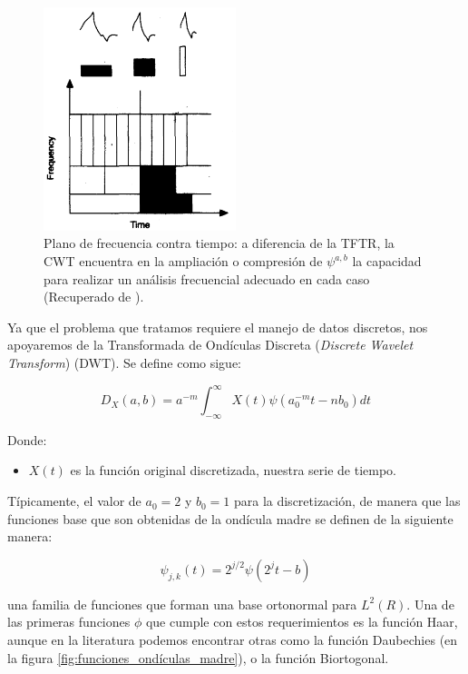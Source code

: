 \begin{figure}[h]
    \centering
    \includegraphics[width=0.5\textwidth]{Figuras/descomposicion/tiempo_frecuencia_WT.png}
    \caption{Plano de frecuencia contra tiempo: a diferencia de la TFTR, la CWT encuentra en la ampliación o compresión de $\psi^{a,b}$ la capacidad para realizar un análisis frecuencial adecuado en cada caso (Recuperado de \cite{an_introduction_to_wavelets}).} 
    \label{fig:tiempo_frecuencia_CWT}
\end{figure}

Ya que el problema que tratamos requiere el manejo de datos discretos, nos apoyaremos de la Transformada de Ondículas Discreta (\textit{Discrete Wavelet Transform}) (DWT). Se define como sigue:

\[
D_{X}(a,b) = a^{-m} \int_{-\infty}^{\infty} X(t) \psi\left( a_{0}^{-m}t-nb_{0} \right) dt
\]

Donde:
\begin{itemize}
  \item \( X(t) \) es la función original discretizada, nuestra serie de tiempo.
\end{itemize}

Típicamente, el valor de $a_0=2$ y $b_0 = 1$ para la discretización, de manera que %
las funciones base que son obtenidas de la ondícula madre se definen de la siguiente manera:

\[\psi_{j,k}(t) = 2^{j/2} \psi(2^{j} t - b)\]

 una familia de funciones que forman una base ortonormal para $L^2(R)$. Una de las primeras funciones $\phi$ que cumple con estos requerimientos es la función Haar, aunque en la literatura podemos encontrar otras como la función Daubechies (en la figura \ref{fig:funciones_ondículas_madre}), o la función Biortogonal.

